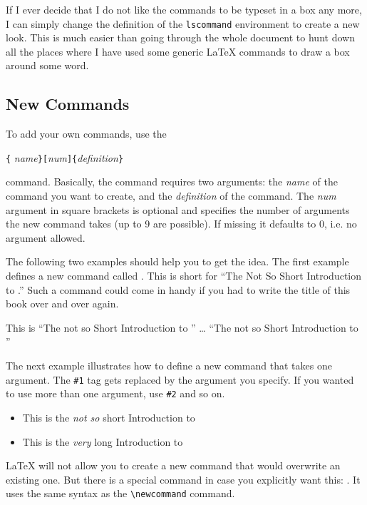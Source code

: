If I ever decide that I do not like the commands to be typeset in
a box any more, I can simply change the definition of the
\texttt{lscommand} environment to create a new look. This is much
easier than going through the whole document to hunt down all the
places where I have used some generic \LaTeX{} commands to draw a
box around some word. 


\subsection{New Commands}

To add your own commands, use the
\begin{lscommand}
\verb|{|%
       \emph{name}\verb|}[|\emph{num}\verb|]{|\emph{definition}\verb|}|
\end{lscommand}
\noindent command. 
Basically, the command requires two arguments: the \emph{name} of the
command you want to create, and the \emph{definition} of the command.
The \emph{num} argument in square brackets is optional and specifies the number
of arguments the new command takes (up to 9 are possible).
If missing it defaults to 0, i.e. no argument allowed.

The following two examples should help you to get the idea.
The first example defines a new command called . This is
short for ``The Not So Short Introduction to \LaTeXe.'' Such a command
could come in handy if you had to write the title of this book over 
and over again. 

\begin{example}
\newcommand{\tnss}{The not
    so Short Introduction to
    \LaTeXe}
This is ``\tnss'' \ldots{} 
``\tnss''
\end{example}

The next example illustrates how to define a new
command that takes one argument.
The \verb|#1| tag gets replaced by the argument you specify.
If you wanted to use more than one argument, use \verb|#2| and
so on.

\begin{example}
\newcommand{\txsit}[2]
 {This is the \emph{#1} #2 Introduction to \LaTeXe}
\begin{itemize}
\item \txsit{not so}{short}
\item \txsit{very}{long}
\end{itemize}
\end{example}

\LaTeX{} will not allow you to create a new command that would
overwrite an existing one. But there is a special command in case you
explicitly want this: .
It uses the same syntax as the \verb|\newcommand|
command.

